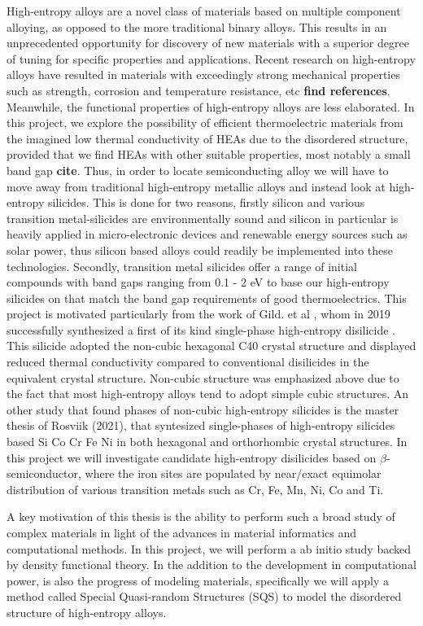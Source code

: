 \documentclass[UKenglish]{ifimaster}  %
\begin{document}
High-entropy alloys are a novel class of materials based on multiple component alloying, as opposed to the more traditional binary alloys. This results in an unprecedented opportunity for discovery of new materials with a superior degree of tuning for specific properties and applications. Recent research on high-entropy alloys have resulted in materials with exceedingly strong mechanical properties such as strength, corrosion and temperature resistance, etc \textbf{find references}. Meanwhile, the functional properties of high-entropy alloys are less elaborated. In this project, we explore the possibility of efficient thermoelectric materials from the imagined low thermal conductivity of HEAs due to the disordered structure, provided that we find HEAs with other suitable properties, most notably a small band gap \textbf{cite}. Thus, in order to locate semiconducting alloy we will have to move away from traditional high-entropy metallic alloys and instead look at high-entropy silicides. This is done for two reasons, firstly silicon and various transition metal-silicides are environmentally sound and silicon in particular is heavily applied in micro-electronic devices and renewable energy sources such as solar power, thus silicon based alloys could readily be implemented into these technologies. Secondly, transition metal silicides offer a range of initial compounds with band gaps ranging from 0.1 - 2 eV to base our high-entropy silicides on that match the band gap requirements of good thermoelectrics. This project is motivated particularly from the work of Gild. et al \cite{GILD2019337}, whom in 2019 successfully synthesized a first of its kind single-phase high-entropy disilicide . This silicide adopted the non-cubic hexagonal C40 crystal structure and displayed reduced thermal conductivity compared to conventional disilicides in the equivalent crystal structure. Non-cubic structure was emphasized above due to the fact that most high-entropy alloys tend to adopt simple cubic structures. An other study that found phases of non-cubic high-entropy silicides is the master thesis of Rosviik (2021), that syntesized single-phases of high-entropy silicides based Si Co Cr Fe Ni in both hexagonal and orthorhombic crystal structures. In this project we will investigate candidate high-entropy disilicides based on $\beta$- semiconductor, where the iron sites are populated by near/exact equimolar distribution of various transition metals such as Cr, Fe, Mn, Ni, Co and Ti.  


A key motivation of this thesis is the ability to perform such a broad study of complex materials in light of the advances in material informatics and computational methods. In this project, we will perform a ab initio study backed by density functional theory. In the addition to the development in computational power, is also the progress of modeling materials, specifically we will apply a method called Special Quasi-random Structures (SQS) to model the disordered structure of  high-entropy alloys.
 
\end{document}
